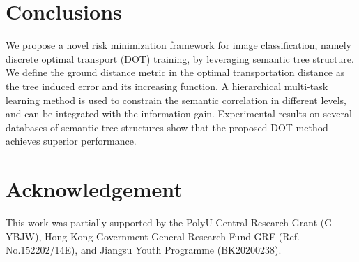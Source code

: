 \documentclass{article}
\theoremstyle{plain}%
\begin{document}
\section{Conclusions}


We propose a novel risk minimization framework for image classification, namely discrete optimal transport (DOT) training, by leveraging semantic tree structure. We define the ground distance metric in the optimal transportation distance as the tree induced error and its increasing function. A hierarchical multi-task learning method is used to constrain the semantic correlation in different levels, and can be integrated with the information gain. Experimental results on several databases of semantic tree structures show that the proposed DOT method achieves superior performance.

\section{Acknowledgement}
This work was partially supported by the PolyU Central Research Grant (G-YBJW), Hong Kong Government General Research Fund GRF (Ref. No.152202/14E), and Jiangsu Youth Programme (BK20200238).
 



\end{document}
